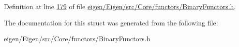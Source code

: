 Definition at line \hyperlink{eigen_2_eigen_2src_2_core_2functors_2_binary_functors_8h_source_l00179}{179} of file \hyperlink{eigen_2_eigen_2src_2_core_2functors_2_binary_functors_8h_source}{eigen/\+Eigen/src/\+Core/functors/\+Binary\+Functors.\+h}.



The documentation for this struct was generated from the following file\+:\begin{DoxyCompactItemize}
\item 
eigen/\+Eigen/src/\+Core/functors/\+Binary\+Functors.\+h\end{DoxyCompactItemize}
